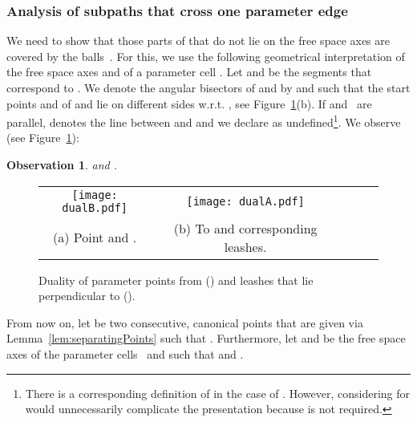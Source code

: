 \documentclass[a4paper,11pt]{article}
\newtheorem{observation}{Observation}
\begin{document}
\subsubsection{Analysis of subpaths that cross one parameter edge}\label{subsec:anaOneCrossing}
	We need to show that those parts of  that do not lie on the free space axes are covered by the balls~. For this, we use the following geometrical interpretation of the free space axes  and  of a parameter cell . Let  and  be the segments that correspond to . We denote the angular bisectors of  and  by  and  such that the start points  and  of  and  lie on different sides w.r.t. , see Figure~\ref{fig:dual}(b). If  and~ are parallel,  denotes the line between  and  and we declare  as undefined\footnote{There is a corresponding definition of  in the case of . However, considering  for  would unnecessarily complicate the presentation because  is not required.}. We observe (see Figure~\ref{fig:dual}):
	
\begin{observation}\label{obs:dual}
	 and  .
\end{observation}

\begin{figure}[ht]
  \begin{center}
    \begin{tabular}{ccccccc}
      \texttt{[image: dualB.pdf]} & &
       \texttt{[image: dualA.pdf]}&&\\ 
{\small (a) Point  and .} & &
      {\small (b) To  and  corresponding leashes.}&&
    \end{tabular}
  \end{center}
  \vspace*{-12pt}
  \caption{Duality of parameter points from  () and leashes that lie perpendicular to  ().}
  \label{fig:dual}
\end{figure}

	From now on, let  be two consecutive, canonical points that are given via Lemma~\ref{lem:separatingPoints} such that . Furthermore, let  and  be the free space axes of the parameter cells~ and  such that  and .
	
\end{document}
